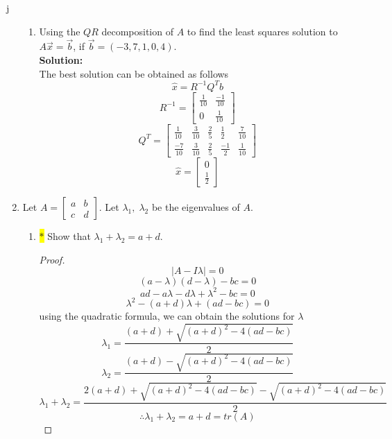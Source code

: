 j\documentclass[12pt]{article}
\begin{document}
\begin{enumerate}
\begin{enumerate}
  
		\item  Using the $QR$ decomposition of $A$ to find the least squares solution to $A\vec x = \vec b$, if $\vec b = (-3,7,1,0,4)$.\\
        \textbf{Solution:}\\
        The best solution can be obtained as follows
        \[
        \hat{x} = R^{-1}Q^Tb
        \]
        \[
        R^{-1} = 
        \begin{bmatrix}
        \frac{1}{10} & \frac{-1}{10} \\
        0 & \frac{1}{10}
        \end{bmatrix}
        \]
        \[
        Q^T=
        \begin{bmatrix}
        \frac{1}{10} & \frac{3}{10} & \frac{2}{5} & \frac{1}{2} & \frac{7}{10} \\
        \frac{-7}{10} & \frac{3}{10} & \frac{2}{5} & \frac{-1}{2} & \frac{1}{10}
        \end{bmatrix}
        \]
        \[
        \hat{x} = \begin{bmatrix}
            0\\ \frac{1}{2}
        \end{bmatrix}
        \]
		\end{enumerate} 

        

 \item Let $A = \begin{bmatrix} a&b\\c&d\end{bmatrix}$.  Let $\lambda_{1}, \; \lambda_{2}$ be the eigenvalues of $A$.  
\begin{enumerate}
    \item \colorbox{yellow}{$\ast$}  Show that $\lambda_{1} + \lambda_{2} = a + d$.\\
    \begin{proof} 
    \[
    |A-I\lambda|=0
    \]
    \[
    (a-\lambda)(d-\lambda)-bc=0
    \]
    \[
    ad-a\lambda-d\lambda+\lambda^2-bc=0
    \]
    \[
    \lambda^2 -(a+d)\lambda +(ad-bc)=0
    \]
    using the quadratic formula, we can obtain the solutions for $\lambda$
    \[
    \lambda_1= \frac{(a+d)+\sqrt{(a+d)^2-4(ad-bc)}}{2}
    \]
    \[
    \lambda_2= \frac{(a+d)-\sqrt{(a+d)^2-4(ad-bc)}}{2}
    \]
    \[
    \lambda_1+\lambda_2 = \frac{2(a+d)+\sqrt{(a+d)^2-4(ad-bc)}-\sqrt{(a+d)^2-4(ad-bc)}}{2}
    \]
    \[
    \therefore \lambda_1+\lambda_2 = a+d = tr(A)
    \]
    \end{proof}


\end{enumerate}
\end{enumerate}
\end{document}
